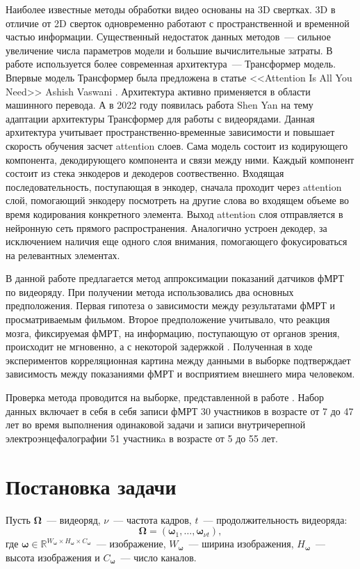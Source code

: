 \documentclass[12pt,twoside]{article}
\begin{document}
Наиболее известные методы обработки видео основаны на 3D свертках. 
3D в отличие от 2D сверток одновременно работают с пространственной  
и временной частью информации. Существенный недостаток данных методов~--- 
сильное увеличение числа параметров модели и большие вычислительные затраты.
В работе используется более современная архитектура~--- Трансформер модель.
Впервые модель Трансформер была предложена в статье <<Attention Is All You Need>> Ashish Vaswani 
\citep{https://doi.org/10.48550/arxiv.1706.03762}. Архитектура активно применяется в области машинного перевода.
А в 2022 году появилась работа Shen Yan \citep{transformer} на тему адаптации архитектуры Трансформер для работы с видеорядами. 
Данная архитектура учитывает пространственно-временные зависимости и повышает скорость обучения засчет attention слоев.
Сама модель состоит из кодирующего компонента, декодирующего компонента и связи между ними. Каждый компонент состоит из стека 
энкодеров и декодеров соотвественно. 
Входящая последовательность, поступающая в энкодер, сначала проходит через attention слой, помогающий энкодеру 
посмотреть на другие слова во входящем объеме во время кодирования конкретного элемента. 
Выход attention слоя отправляется в нейронную сеть прямого распространения. 
Аналогично устроен декодер, за исключением наличия еще одного слоя внимания, помогающего фокусироваться на релевантных элементах.

В данной работе предлагается метод аппроксимации показаний датчиков фМРТ по видеоряду. 
При получении метода использовались два основных предположения. Первая гипотеза о зависимости между результатами фМРТ и просматриваемым фильмом.
Второе предположение учитывало, что реакция мозга, фиксируемая фМРТ, на информацию, поступающую от органов зрения, происходит не мгновенно, а с некоторой задержкой \citep{Demidov}. 
Полученная в ходе экспериментов корреляционная картина между данными в выборке подтверждает 
зависимость между показаниями фМРТ и восприятием внешнего мира человеком. 

Проверка метода проводится на выборке, представленной в работе \citep{Berezutskaya2022}. 
Набор данных включает в себя в себя записи фМРТ 30 участников в возрасте от 7 до 47 лет во время 
выполнения одинаковой задачи и записи внутричерепной электроэнцефалографии 51 участникa в возрасте от 5 до 55 лет. 


\section{Постановка задачи}
Пусть $\mathbf{\Omega}$~--- видеоряд, $\nu$~--- частота кадров, $t$~--- продолжительность видеоряда:
\begin{equation}
    \bm{\Omega} = (\bm{\omega}_{1}, \dots, \bm{\omega}_{\nu t}),
\end{equation}
где $\bm{\omega} \in \mathbb{R}^{W_{\bm{\omega}} \times H_{\bm{\omega}} \times C_{\bm{\omega}}}$~--- изображение, $W_{\bm{\omega}}$~---
ширина изображения, $H_{\bm{\omega}}$~--- высота изображения и $C_{\bm{\omega}}$~--- число каналов.
\end{document}
